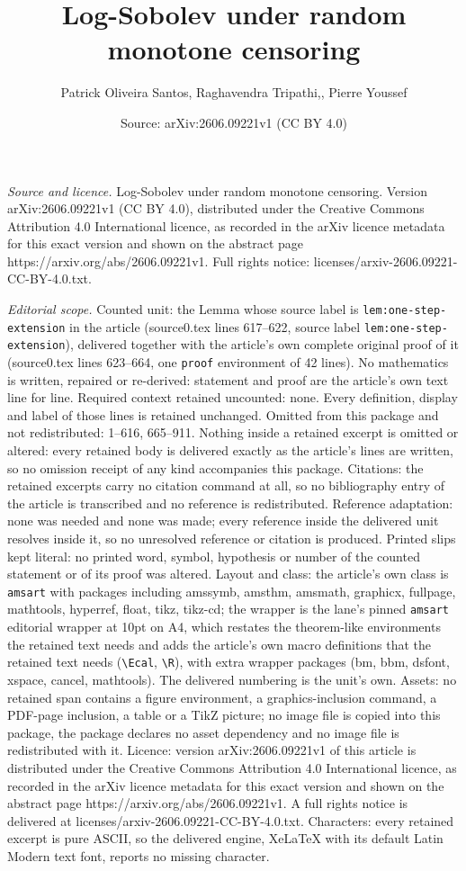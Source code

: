 \documentclass[10pt,a4paper]{amsart}
\title[Log-Sobolev under random monotone censoring]{Log-Sobolev under random monotone censoring}
\author{Patrick Oliveira Santos, Raghavendra Tripathi,, Pierre Youssef}
\date{Source: arXiv:2606.09221v1 (CC BY 4.0)}
\begin{document}
\maketitle

\noindent\emph{Source and licence.} Log-Sobolev under random monotone censoring. Version arXiv:2606.09221v1 (CC BY 4.0), distributed under the Creative Commons Attribution 4.0 International licence, as recorded in the arXiv licence metadata for this exact version and shown on the abstract page https://arxiv.org/abs/2606.09221v1. Full rights notice: licenses/arxiv-2606.09221-CC-BY-4.0.txt.\par\smallskip

\noindent\textit{Editorial scope.} Counted unit: the Lemma whose source label is \texttt{lem:one-step-extension} in the article (source0.tex lines 617--622, source label \texttt{lem:one-step-extension}), delivered together with the article's own complete original proof of it (source0.tex lines 623--664, one \texttt{proof} environment of 42 lines). No mathematics is written, repaired or re-derived: statement and proof are the article's own text line for line. Required context retained uncounted: none. Every definition, display and label of those lines is retained unchanged. Omitted from this package and not redistributed: 1--616, 665--911. Nothing inside a retained excerpt is omitted or altered: every retained body is delivered exactly as the article's lines are written, so no omission receipt of any kind accompanies this package. Citations: the retained excerpts carry no citation command at all, so no bibliography entry of the article is transcribed and no reference is redistributed. Reference adaptation: none was needed and none was made; every reference inside the delivered unit resolves inside it, so no unresolved reference or citation is produced. Printed slips kept literal: no printed word, symbol, hypothesis or number of the counted statement or of its proof was altered. Layout and class: the article's own class is \texttt{amsart} with packages including amssymb, amsthm, amsmath, graphicx, fullpage, mathtools, hyperref, float, tikz, tikz-cd; the wrapper is the lane's pinned \texttt{amsart} editorial wrapper at 10pt on A4, which restates the theorem-like environments the retained text needs and adds the article's own macro definitions that the retained text needs (\texttt{\textbackslash Ecal}, \texttt{\textbackslash R}), with extra wrapper packages (bm, bbm, dsfont, xspace, cancel, mathtools). The delivered numbering is the unit's own. Assets: no retained span contains a figure environment, a graphics-inclusion command, a PDF-page inclusion, a table or a TikZ picture; no image file is copied into this package, the package declares no asset dependency and no image file is redistributed with it. Licence: version arXiv:2606.09221v1 of this article is distributed under the Creative Commons Attribution 4.0 International licence, as recorded in the arXiv licence metadata for this exact version and shown on the abstract page https://arxiv.org/abs/2606.09221v1. A full rights notice is delivered at licenses/arxiv-2606.09221-CC-BY-4.0.txt. Characters: every retained excerpt is pure ASCII, so the delivered engine, XeLaTeX with its default Latin Modern text font, reports no missing character.
\end{document}
